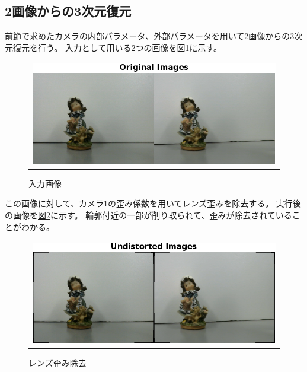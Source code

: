 \documentclass[]{jarticle}          %
\begin{document}
\subsection{2画像からの3次元復元}
前節で求めたカメラの内部パラメータ、外部パラメータを用いて2画像からの3次元復元を行う。
入力として用いる2つの画像を\hyperref[four]{図\ref{four}}に示す。
\begin{figure}[!ht]
  \begin{center}
    \begin{tabular}{c}
      \includegraphics[keepaspectratio, scale=1.0]{figures/1.png}\\
    \end{tabular}
  \end{center}
  \caption{入力画像}
  \label{four}
\end{figure}
\newline
この画像に対して、カメラ1の歪み係数を用いてレンズ歪みを除去する。
実行後の画像を\hyperref[five]{図\ref{five}}に示す。
輪郭付近の一部が削り取られて、歪みが除去されていることがわかる。
\begin{figure}[!ht]
  \begin{center}
    \begin{tabular}{c}
      \includegraphics[keepaspectratio, scale=1.0]{figures/2.png}\\
    \end{tabular}
  \end{center}
  \caption{レンズ歪み除去}
  \label{five}
\end{figure}
\end{document}
